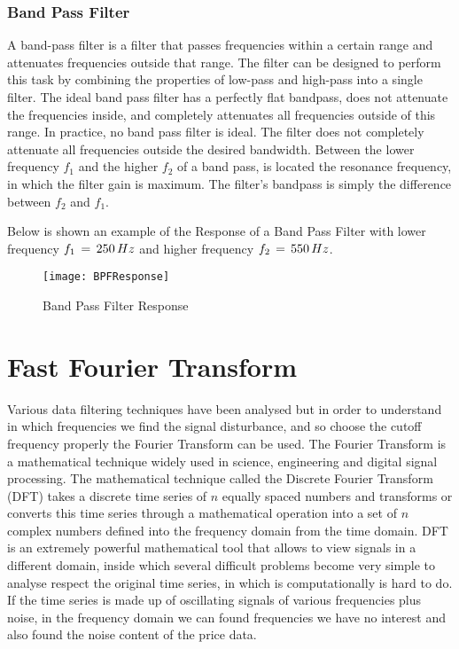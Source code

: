 \documentclass[tesi]{subfiles}
\begin{document}
\subsubsection{Band Pass Filter} \label{ssc:Band Pass Filter}
A band-pass filter is a filter that passes frequencies within a certain range and attenuates frequencies outside that range. 
The filter can be designed to perform this task by combining the properties of low-pass and high-pass into a single filter.
The ideal band pass filter has a perfectly flat bandpass, does not attenuate the frequencies inside, and completely attenuates all frequencies outside of this range.
In practice, no band pass filter is ideal. The filter does not completely attenuate all frequencies outside the desired bandwidth.
Between the lower frequency $f_{1}$ and the higher $f_{2}$ of a band pass, is located the resonance frequency, in which the filter gain is maximum. 
The filter's bandpass is simply the difference between $f_{2}$ and $f_{1}$. 

Below is shown an example of the Response of a Band Pass Filter with lower frequency $f_{1} \thinspace = \thinspace 250 \thinspace Hz$ and higher frequency $f_{2} \thinspace = \thinspace 550 \thinspace Hz$. 

\begin{figure}[H]
\centering
\texttt{[image: BPFResponse]} 
 \caption{Band Pass Filter Response}
  \label{fig:Band Pass Filter Response}
\end{figure}
\section{Fast Fourier Transform} \label{sc:Fast Fourier Transform}
Various data filtering techniques have been analysed but in order to understand in which frequencies we find the signal disturbance, and so choose the cutoff frequency properly the Fourier Transform can be used.
The Fourier Transform is a mathematical technique widely used in science, engineering and digital signal processing. 
The mathematical technique called the Discrete Fourier Transform (DFT) takes a discrete time series of $n$ equally spaced numbers and transforms or converts this time series through a mathematical operation into a set of $n$ complex numbers defined into the frequency domain from the time domain. 
DFT is an extremely powerful mathematical tool that allows to view signals in a different domain, inside which several difficult problems become very simple to analyse respect the original time series, in which is computationally is hard to do.
If the time series is made up of oscillating signals of various frequencies plus noise, in the frequency domain we can found frequencies we have no interest and also found the noise content of the price data.
\end{document}
